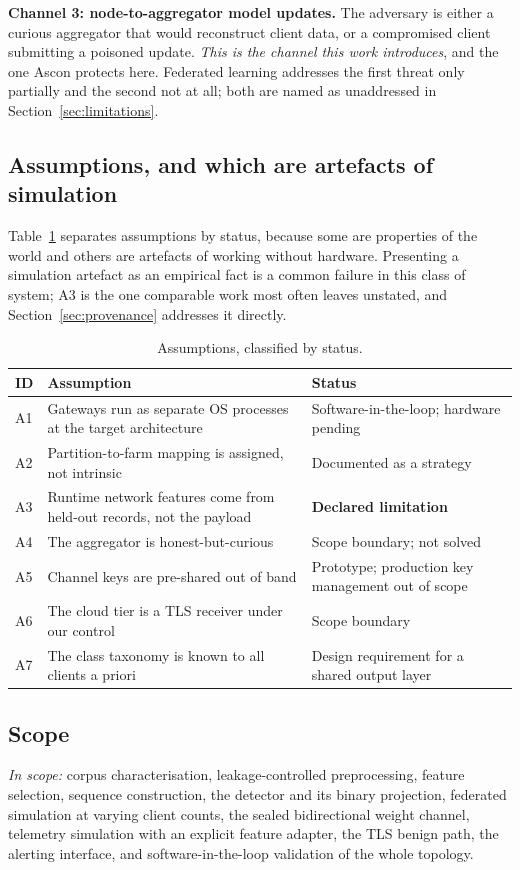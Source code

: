 \documentclass[conference]{IEEEtran}
\begin{document}
\textbf{Channel 3: node-to-aggregator model updates.} The adversary is either a curious
aggregator that would reconstruct client data, or a compromised client submitting a poisoned
update. \emph{This is the channel this work introduces}, and the one Ascon protects here. Federated
learning addresses the first threat only partially and the second not at all; both are named as
unaddressed in Section~\ref{sec:limitations}.

\subsection{Assumptions, and which are artefacts of simulation}
Table~\ref{tab:assumptions} separates assumptions by status, because some are properties of the
world and others are artefacts of working without hardware. Presenting a simulation artefact as an
empirical fact is a common failure in this class of system; A3 is the one comparable work most
often leaves unstated, and Section~\ref{sec:provenance} addresses it directly.

\begin{table}[tbp]
\caption{Assumptions, classified by status.}
\label{tab:assumptions}
\centering\footnotesize\setlength{\tabcolsep}{3pt}
\begin{tabular}{@{}p{0.5cm}p{4.9cm}p{3.0cm}@{}}
\toprule
\textbf{ID} & \textbf{Assumption} & \textbf{Status}\\
\midrule
A1 & Gateways run as separate OS processes at the target architecture & Software-in-the-loop; hardware pending\\
A2 & Partition-to-farm mapping is assigned, not intrinsic & Documented as a strategy\\
A3 & Runtime network features come from held-out records, not the payload & \textbf{Declared limitation}\\
A4 & The aggregator is honest-but-curious & Scope boundary; not solved\\
A5 & Channel keys are pre-shared out of band & Prototype; production key management out of scope\\
A6 & The cloud tier is a TLS receiver under our control & Scope boundary\\
A7 & The class taxonomy is known to all clients a priori & Design requirement for a shared output layer\\
\bottomrule
\end{tabular}
\end{table}

\subsection{Scope}
\emph{In scope:} corpus characterisation, leakage-controlled preprocessing, feature selection,
sequence construction, the detector and its binary projection, federated simulation at varying
client counts, the sealed bidirectional weight channel, telemetry simulation with an explicit
feature adapter, the TLS benign path, the alerting interface, and software-in-the-loop validation
of the whole topology.
\end{document}
